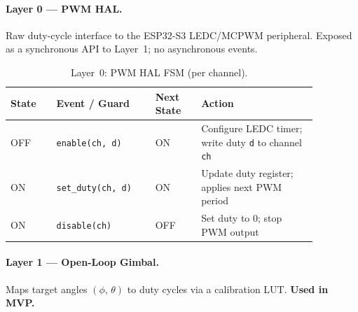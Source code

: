 \documentclass[12pt]{extarticle}
\begin{document}
\paragraph{Layer 0 --- PWM HAL.}
Raw duty-cycle interface to the ESP32-S3 LEDC/MCPWM peripheral.
Exposed as a synchronous API to Layer~1; no asynchronous events.

\begin{table}[H]
\small\centering
\begin{tabular}{>{\raggedright}p{0.13\linewidth}
                >{\raggedright}p{0.28\linewidth}
                >{\raggedright}p{0.13\linewidth}
                >{\raggedright\arraybackslash}p{0.33\linewidth}}
\toprule
\textbf{State} & \textbf{Event / Guard} & \textbf{Next State} & \textbf{Action} \\
\midrule
OFF & \texttt{enable(ch, d)}    & ON  & Configure LEDC timer; write duty \texttt{d} to channel \texttt{ch} \\
ON  & \texttt{set\_duty(ch, d)} & ON  & Update duty register; applies next PWM period \\
ON  & \texttt{disable(ch)}      & OFF & Set duty to 0; stop PWM output \\
\bottomrule
\end{tabular}
\caption{Layer~0: PWM HAL FSM (per channel).}
\label{tab:fsm-pwm-hal}
\end{table}

\paragraph{Layer 1 --- Open-Loop Gimbal.}
Maps target angles $(\phi,\,\theta)$ to duty cycles via a calibration LUT.
\textbf{Used in MVP.}
\end{document}
